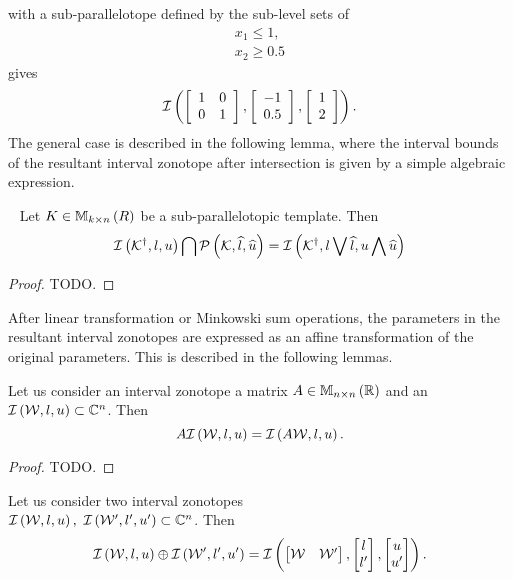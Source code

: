 with a sub-parallelotope defined by the sub-level sets of
%
\begin{align*}
  x_1\leq 1,\\
  x_2\geq 0.5
\end{align*}
%
gives
%
\[
\mathit{\operatorname{\mathcal{I}}}\left(\left[\begin{array}{l
        l}1 & 0 \\ 0 &
      1\end{array}\right],\left[\begin{array}{c}-1\\ 0.5\end{array}\right],\left[\begin{array}{c}1\\ 2\end{array}\right]\right).
\]
%
The general case is described in the following lemma, where the
interval bounds of the resultant interval zonotope after intersection
is given by a simple algebraic expression.
%
\begin{lemma}~\label{lem:motivation}
Let $K\in\mathbb{M}_{k\times n}\left(R\right)$ be a sub-parallelotopic template.  Then
\[
\mathit{\operatorname{\mathcal{I}}}\left({\mathcal{K}}^\dagger,l,u\right) \bigcap \mathcal{P}\left(\mathcal{K},\widehat{l},\widehat{u}\right)
= \mathit{\operatorname{\mathcal{I}}}\left({\mathcal{K}}^\dagger,l\bigvee \widehat{l},u\bigwedge \widehat{u}\right)
\]
\end{lemma}
%
\begin{proof}
{\color{red} TODO}.
\end{proof}
%
After linear transformation or Minkowski sum operations, the
parameters in the resultant interval zonotopes are expressed as an
affine transformation of the original parameters.  This is described
in the following lemmas.
%
\begin{lemma}
  Let us consider an interval zonotope a matrix
  $A\in\mathbb{M}_{n\times n}\left(\mathbb{R}\right)$ and an
  $\mathit{\operatorname{\mathcal{I}}}\left(\mathcal{W},l,u\right)\subset\mathbb{C}^n$.  Then
%
\[
A\mathit{\operatorname{\mathcal{I}}}\left(\mathcal{W},l,u\right)=\mathit{\operatorname{\mathcal{I}}}\left(A\mathcal{W},l,u\right).
\]
\end{lemma}
%
\begin{proof}
{\color{red} TODO}.
\end{proof}
%
\begin{lemma}
  Let us consider two interval zonotopes\\
  $\mathit{\operatorname{\mathcal{I}}}\left(\mathcal{W},l,u\right),~\mathit{\operatorname{\mathcal{I}}}\left(\mathcal{W}^\prime,l^\prime,u^\prime\right)\subset\mathbb{C}^n$.
  Then 
%
\[
\mathit{\operatorname{\mathcal{I}}}\left(\mathcal{W},l,u\right)\oplus \mathit{\operatorname{\mathcal{I}}}\left(\mathcal{W}^\prime,l^\prime,u^\prime\right)
= \mathit{\operatorname{\mathcal{I}}}\left(\left[\begin{matrix}\mathcal{W} &
    \mathcal{W}^\prime\end{matrix}\right],\left[\begin{matrix}l\\l^\prime\end{matrix}\right],\left[\begin{matrix}u\\u^\prime\end{matrix}\right]\right). 
\]
%
\end{lemma}
